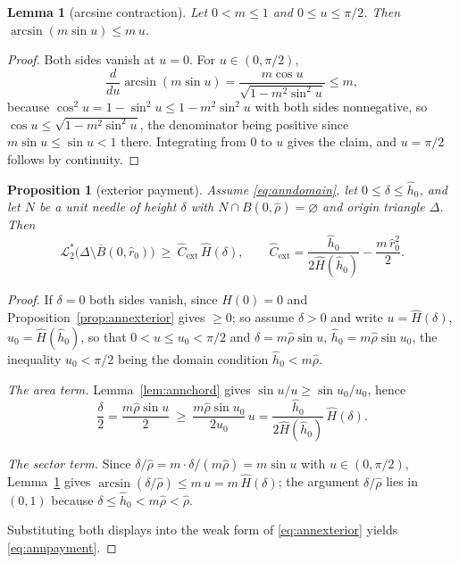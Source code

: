 \documentclass[11pt]{article}
\theoremstyle{plain}
\newtheorem{proposition}[theorem]{Proposition}
\newtheorem{lemma}[theorem]{Lemma}
\theoremstyle{definition}
\theoremstyle{remark}
\newcommand{\Lout}{\mathcal{L}^{*}_{2}}
\begin{document}
\begin{lemma}[arcsine contraction]\label{lem:annarcsin}
Let $0<m\le1$ and $0\le u\le\pi/2$. Then $\arcsin(m\sin u)\le m\,u$.
\end{lemma}

\begin{proof}
Both sides vanish at $u=0$. For $u\in(0,\pi/2)$,
\[
  \frac{d}{du}\arcsin(m\sin u)=\frac{m\cos u}{\sqrt{1-m^{2}\sin^{2}u}}\le m,
\]
because $\cos^{2}u=1-\sin^{2}u\le1-m^{2}\sin^{2}u$ with both sides
nonnegative, so $\cos u\le\sqrt{1-m^{2}\sin^{2}u}$, the denominator being
positive since $m\sin u\le\sin u<1$ there. Integrating from $0$ to $u$ gives
the claim, and $u=\pi/2$ follows by continuity.
\end{proof}

\begin{proposition}[exterior payment]\label{prop:annpayment}
Assume \eqref{eq:anndomain}, let $0\le\delta\le\hat h_{0}$, and let $N$ be a
unit needle of height $\delta$ with $N\cap B(0,\hat\rho)=\varnothing$ and
origin triangle $\Delta$. Then
\begin{equation}\label{eq:annpayment}
  \Lout\bigl(\Delta\setminus\overline B(0,\hat r_{0})\bigr)
  \ \ge\ \hat C_{\mathrm{ext}}\,\hat H(\delta),
  \qquad
  \hat C_{\mathrm{ext}}=\frac{\hat h_{0}}{2\hat H(\hat h_{0})}
    -\frac{m\,\hat r_{0}^{2}}{2}.
\end{equation}
\end{proposition}

\begin{proof}
If $\delta=0$ both sides vanish, since $\hat H(0)=0$ and
Proposition~\ref{prop:annexterior} gives $\ge0$; so assume $\delta>0$ and write
$u=\hat H(\delta)$, $u_{0}=\hat H(\hat h_{0})$, so that $0<u\le u_{0}<\pi/2$
and $\delta=m\hat\rho\sin u$, $\hat h_{0}=m\hat\rho\sin u_{0}$, the inequality
$u_{0}<\pi/2$ being the domain condition $\hat h_{0}<m\hat\rho$.

\emph{The area term.} Lemma~\ref{lem:annchord} gives
$\sin u/u\ge\sin u_{0}/u_{0}$, hence
\[
  \frac{\delta}{2}=\frac{m\hat\rho\sin u}{2}
  \ \ge\ \frac{m\hat\rho\sin u_{0}}{2u_{0}}\,u
  =\frac{\hat h_{0}}{2\hat H(\hat h_{0})}\,\hat H(\delta).
\]

\emph{The sector term.} Since
$\delta/\hat\rho=m\cdot\delta/(m\hat\rho)=m\sin u$ with $u\in(0,\pi/2)$,
Lemma~\ref{lem:annarcsin} gives
$\arcsin(\delta/\hat\rho)\le m\,u=m\,\hat H(\delta)$; the argument
$\delta/\hat\rho$ lies in $(0,1)$ because
$\delta\le\hat h_{0}<m\hat\rho<\hat\rho$.

Substituting both displays into the weak form of \eqref{eq:annexterior} yields
\eqref{eq:annpayment}.
\end{proof}
\end{document}
